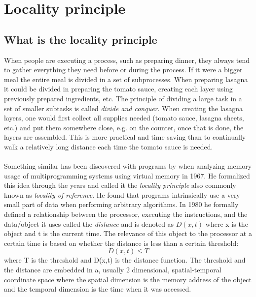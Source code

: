 \documentclass[pdftex,a4paper,12pt,twoside]{report}
\begin{document}
\section{Locality principle}
\subsection{What is the locality principle}
When people are executing a process, such as preparing dinner, they always tend to gather everything they need before or during the process. If it were a bigger meal the entire meal is divided in a set of subprocesses. When preparing lasagna it could be divided in preparing the tomato sauce, creating each layer using previously prepared ingredients, etc. The principle of dividing a large task in a set of smaller subtasks is called \emph{divide and conquer}. %
When creating the lasagna layers, one would first collect all supplies needed (tomato sauce, lasagna sheets, etc.) and put them somewhere close, e.g. on the counter, once that is done, the layers are assembled. This is more practical and time saving than to continually walk a relatively long distance each time the tomato sauce is needed.
\\\\
Something similar has been discovered with programs by \cite{locality_principle} when analyzing memory usage of multiprogramming systems using virtual memory in 1967.
He formalized this idea through the years and called it the \emph{locality principle} also commonly known as \emph{locality of reference}. He found that programs intrinsically use a very small part of data when performing arbitrary algorithms. In 1980 he formally defined a relationship between the processor, executing the instructions, and the data/object it uses called the \emph{distance} and is denoted as $D(x,t)$ where x is the object and t is the current time. The relevance of this object to the processor at a certain time is based on whether the distance is less than a certain threshold:
\[
	D(x,t) \leq T
\]
where T is the threshold and D(x,t) is the distance function. The threshold and the distance are embedded in a, usually 2 dimensional, spatial-temporal coordinate space where the spatial dimension is the memory address of the object and the temporal dimension is the time when it was accessed.
\end{document}
